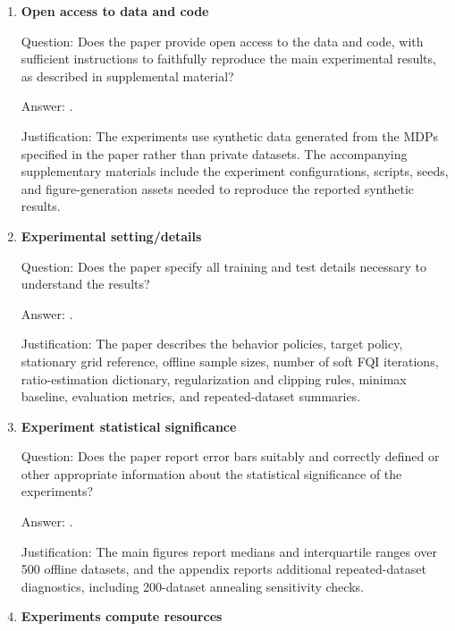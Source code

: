 \documentclass{article}
\theoremstyle{plain}
\theoremstyle{definition}
\theoremstyle{remark}
\begin{document}
\begin{enumerate}[leftmargin=5mm]
Answer: \answerYes{}.

Justification: The paper specifies the controlled navigation MDP, behavior
regimes, temperatures, sample sizes, number of datasets, \(Q\)-features,
stationary-weight estimators, clipping and stabilization rules, minimax
baseline, diagnostics, and annealing schedule in the experiments section and
Appendix~\ref{app:soft-fqi-simulation-details}.

\item \textbf{Open access to data and code}

Question: Does the paper provide open access to the data and code, with
sufficient instructions to faithfully reproduce the main experimental results,
as described in supplemental material?

Answer: \answerYes{}.

Justification: The experiments use synthetic data generated from the MDPs
specified in the paper rather than private datasets. The accompanying
supplementary materials include the experiment configurations, scripts, seeds,
and figure-generation assets needed to reproduce the reported synthetic
results.

\item \textbf{Experimental setting/details}

Question: Does the paper specify all training and test details necessary to
understand the results?

Answer: \answerYes{}.

Justification: The paper describes the behavior policies, target policy,
stationary grid reference, offline sample sizes, number of soft FQI iterations,
ratio-estimation dictionary, regularization and clipping rules, minimax
baseline, evaluation metrics, and repeated-dataset summaries.

\item \textbf{Experiment statistical significance}

Question: Does the paper report error bars suitably and correctly defined or
other appropriate information about the statistical significance of the
experiments?

Answer: \answerYes{}.

Justification: The main figures report medians and interquartile ranges over
500 offline datasets, and the appendix reports additional repeated-dataset
diagnostics, including 200-dataset annealing sensitivity checks.

\item \textbf{Experiments compute resources}


\end{enumerate}
\end{document}
